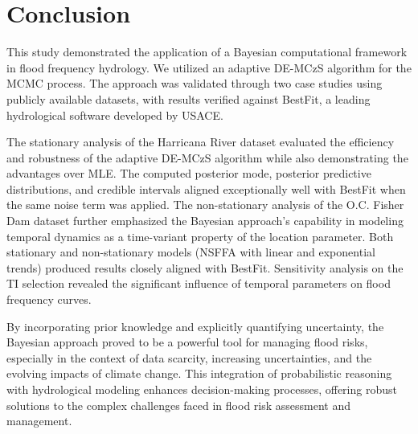 \section{Conclusion}
This study demonstrated the application of a Bayesian computational framework in flood frequency hydrology. We utilized an adaptive DE-MCzS algorithm for the MCMC process. The approach was validated through two case studies using publicly available datasets, with results verified against BestFit, a leading hydrological software developed by USACE. 

The stationary analysis of the Harricana River dataset evaluated the efficiency and robustness of the adaptive DE-MCzS algorithm while also demonstrating the advantages over MLE. The computed posterior mode, posterior predictive distributions, and credible intervals aligned exceptionally well with BestFit when the same noise term was applied. The non-stationary analysis of the O.C. Fisher Dam dataset further emphasized the Bayesian approach’s capability in modeling temporal dynamics as a time-variant property of the location parameter. Both stationary and non-stationary models (NSFFA with linear and exponential trends) produced results closely aligned with BestFit. Sensitivity analysis on the TI selection revealed the significant influence of temporal parameters on flood frequency curves. 

By incorporating prior knowledge and explicitly quantifying uncertainty, the Bayesian approach proved to be a powerful tool for managing flood risks, especially in the context of data scarcity, increasing uncertainties, and the evolving impacts of climate change. This integration of probabilistic reasoning with hydrological modeling enhances decision-making processes, offering robust solutions to the complex challenges faced in flood risk assessment and management.